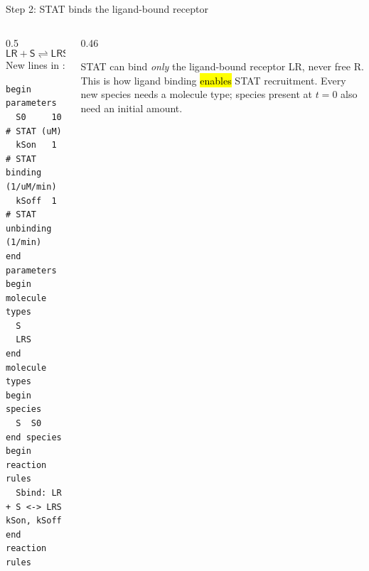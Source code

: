 \documentclass[aspectratio=169,10pt,t]{beamer}
\begin{document}
\begin{frame}[fragile]{Step 2: STAT binds the ligand-bound receptor}
  \begin{columns}[T]
    \begin{column}{0.5\textwidth}
      \[
        \mathsf{LR} + \mathsf{S} \rightleftharpoons \mathsf{LRS}
      \]
      New lines in :
\begin{lstlisting}[language=bngl,basicstyle=\ttfamily\scriptsize]
begin parameters
  S0     10   # STAT (uM)
  kSon   1    # STAT binding (1/uM/min)
  kSoff  1    # STAT unbinding (1/min)
end parameters
begin molecule types
  S
  LRS
end molecule types
begin species
  S  S0
end species
begin reaction rules
  Sbind: LR + S <-> LRS kSon, kSoff
end reaction rules
\end{lstlisting}
    \end{column}
    \begin{column}{0.46\textwidth}
      \centering
      \vskip2mm
      \raggedright
      STAT can bind \emph{only} the ligand-bound receptor LR, never free R.
      This is how ligand binding \hl{enables} STAT recruitment.
      \vskip2mm
      {\small Every new species needs a molecule type; species present at $t=0$
      also need an initial amount.}
    \end{column}
  \end{columns}
\end{frame}
\end{document}
